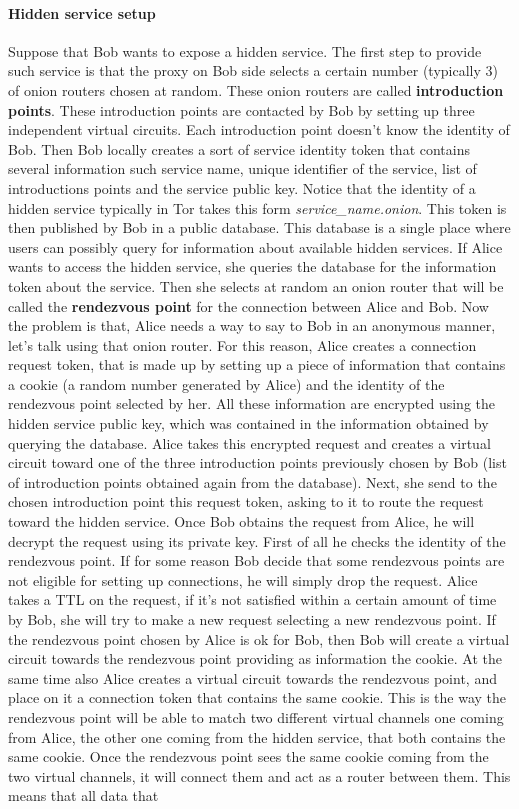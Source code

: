 \paragraph{Hidden service setup} Suppose that Bob wants to expose a hidden service. The first step to provide such service is that the proxy on Bob side selects a certain number (typically $3$) of onion routers chosen at random. These onion routers are called \textbf{introduction points}. These introduction points are contacted by Bob by setting up three independent virtual circuits. Each introduction point doesn't know the identity of Bob. Then Bob locally creates a sort of service identity token that contains several information such service name, unique identifier of the service, list of introductions points and the service public key. Notice that the identity of a hidden service typically in Tor takes this form \textit{service\_name.onion}. This token is then published by Bob in a public database. This database is a single place where users can possibly query for information about available hidden services. If Alice wants to access the hidden service, she queries the database for the information token about the service. Then she selects at random an onion router that will be called the \textbf{rendezvous point} for the connection between Alice and Bob. Now the problem is that, Alice needs a way to say to Bob in an anonymous manner, let's talk using that onion router. For this reason, Alice creates a connection request token, that is made up by setting up a piece of information that contains a cookie (a random number generated by Alice) and the identity of the rendezvous point selected by her. All these information are encrypted using the hidden service public key, which was contained in the information obtained by querying the database. Alice takes this encrypted request and creates a virtual circuit toward one of the three introduction points previously chosen by Bob (list of introduction points obtained again from the database). Next, she send to the chosen introduction point this request token, asking to it to route the request toward the hidden service. Once Bob obtains the request from Alice, he will decrypt the request using its private key. First of all he checks the identity of the rendezvous point. If for some reason Bob decide that some rendezvous points are not eligible for setting up connections, he will simply drop the request. Alice takes a TTL on the request, if it's not satisfied within a certain amount of time by Bob, she will try to make a new request selecting a new rendezvous point. If the rendezvous point chosen by Alice is ok for Bob, then Bob will create a virtual circuit towards the rendezvous point providing as information the cookie. At the same time also Alice creates a virtual circuit towards the rendezvous point, and place on it a connection token that contains the same cookie. This is the way the rendezvous point will be able to match two different virtual channels one coming from Alice, the other one coming from the hidden service, that both contains the same cookie. Once the rendezvous point sees the same cookie coming from the two virtual channels, it will connect them and act as a router between them. This means that all data that 
